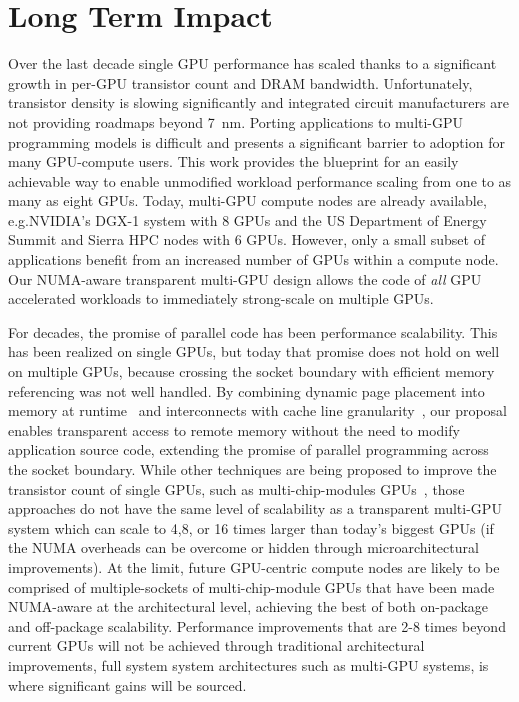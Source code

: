 \documentclass{sig-alternate}
\begin{document}
\vspace{-.05in}
\section{Long Term Impact} Over the last decade single GPU performance has 
scaled thanks to a significant growth in per-GPU transistor count and DRAM 
bandwidth. Unfortunately, transistor density is slowing significantly and 
integrated circuit manufacturers are not providing roadmaps beyond \SI{7}{nm}.
Porting applications to multi-GPU programming models is difficult and presents
a significant barrier to adoption for many GPU-compute users.  This work provides
the blueprint for an easily achievable way to enable unmodified workload performance
scaling from one to as many as eight GPUs.
Today, multi-GPU compute nodes are already available, e.g.\@ NVIDIA's DGX-1 
system with 8 GPUs and the US Department of Energy Summit and Sierra HPC 
nodes with 6 GPUs. However, only a small subset of applications benefit from an increased number of GPUs 
within a compute
node. Our NUMA-aware transparent multi-GPU design allows the code of \textit{all} GPU accelerated 
workloads to immediately strong-scale on multiple GPUs.\@

For decades, the promise of parallel code has been performance scalability. 
This has been realized on single GPUs, but today that promise does not hold on 
well on multiple GPUs, because crossing the socket boundary with efficient memory referencing 
was not well handled. By combining dynamic page placement into memory at 
runtime~\cite{UVM} and interconnects with cache line granularity~\cite{NVLINK}, 
our proposal enables transparent access to remote memory without the need to 
modify application source code, extending the promise of parallel programming across
the socket boundary.  While other techniques are being proposed to improve the transistor
count of single GPUs, such as multi-chip-modules GPUs~\cite{Arunkumar2017}, those
approaches do not have the same level of scalability as a transparent multi-GPU
system which can scale to 4,8, or 16 times larger than today's biggest GPUs (if
the NUMA overheads can be overcome or hidden through microarchitectural improvements).
At the limit, future GPU-centric compute nodes are likely to be comprised of multiple-sockets
of multi-chip-module GPUs that have been made NUMA-aware at the architectural level, achieving
the best of both on-package and off-package scalability.  Performance
improvements that are 2-8 times beyond current GPUs will not be achieved through traditional
architectural improvements, full system system architectures such as multi-GPU systems, is 
where significant gains will be sourced.
\end{document}
